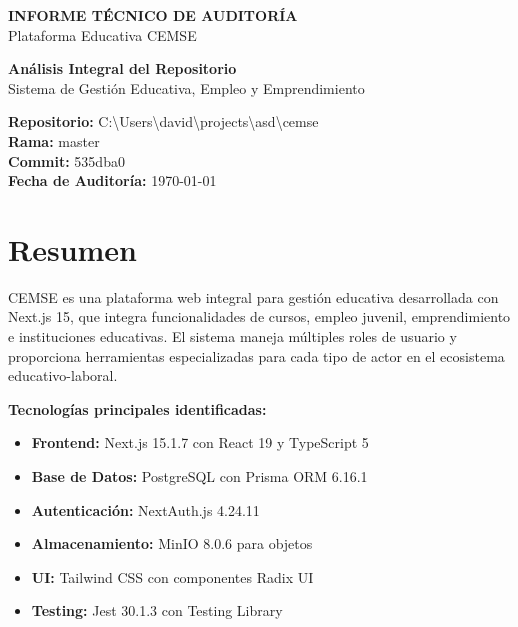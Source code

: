 \documentclass[12pt,a4paper]{article}
\begin{document}
\begin{titlepage}
    \centering
    \vspace*{2cm}

    {\Huge\bfseries INFORME TÉCNICO DE AUDITORÍA\\[0.5cm]}
    {\LARGE Plataforma Educativa CEMSE\\[2cm]}

    \begin{tcolorbox}[colback=red!5!white,colframe=red!75!black,width=0.8\textwidth]
        \centering
        \large
        \textbf{Análisis Integral del Repositorio}\\
        Sistema de Gestión Educativa, Empleo y Emprendimiento
    \end{tcolorbox}

    \vfill

    {\large \textbf{Repositorio:} C:\textbackslash Users\textbackslash david\textbackslash projects\textbackslash asd\textbackslash cemse\\[0.3cm]}
    {\large \textbf{Rama:} master\\[0.3cm]}
    {\large \textbf{Commit:} 535dba0\\[0.3cm]}
    {\large \textbf{Fecha de Auditoría:} \today}

\end{titlepage}

\newpage
\tableofcontents
\newpage

\section{Resumen}

CEMSE es una plataforma web integral para gestión educativa desarrollada con Next.js 15, que integra funcionalidades de cursos, empleo juvenil, emprendimiento e instituciones educativas. El sistema maneja múltiples roles de usuario y proporciona herramientas especializadas para cada tipo de actor en el ecosistema educativo-laboral.

\textbf{Tecnologías principales identificadas:}
\begin{itemize}
    \item \textbf{Frontend:} Next.js 15.1.7 con React 19 y TypeScript 5
    \item \textbf{Base de Datos:} PostgreSQL con Prisma ORM 6.16.1
    \item \textbf{Autenticación:} NextAuth.js 4.24.11
    \item \textbf{Almacenamiento:} MinIO 8.0.6 para objetos
    \item \textbf{UI:} Tailwind CSS con componentes Radix UI
    \item \textbf{Testing:} Jest 30.1.3 con Testing Library
\end{itemize}
\end{document}

